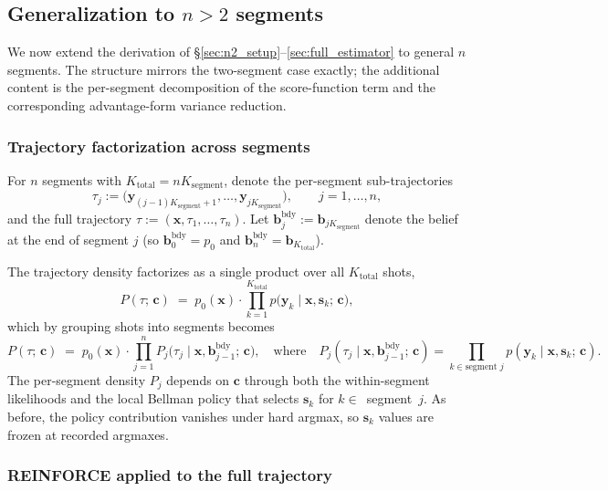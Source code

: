 \documentclass[11pt,a4paper]{article}
\newcommand{\bc}{\bm{c}}
\newcommand{\bx}{\bm{x}}
\newcommand{\by}{\bm{y}}
\newcommand{\bs}{\bm{s}}
\newcommand{\bb}{\bm{b}}
\begin{document}
\subsection{Generalization to \texorpdfstring{$n > 2$}{n > 2} segments}
\label{sec:nseg_general}

We now extend the derivation of \S\ref{sec:n2_setup}--\ref{sec:full_estimator} to general
$n$ segments.  The structure mirrors the two-segment case exactly; the additional content is
the per-segment decomposition of the score-function term and the corresponding advantage-form
variance reduction.

\subsubsection{Trajectory factorization across segments}
\label{sec:nseg_factorization}

For $n$ segments with $K_\mathrm{total} = n K_\mathrm{segment}$, denote the per-segment
sub-trajectories
\[
\tau_j := \bigl(\by_{(j-1)K_\mathrm{segment} + 1}, \ldots, \by_{j K_\mathrm{segment}}\bigr), \qquad j = 1, \ldots, n,
\]
and the full trajectory $\tau := (\bx, \tau_1, \ldots, \tau_n)$.  Let
$\bb^{\mathrm{bdy}}_j := \bb_{j K_\mathrm{segment}}$ denote the belief at the end of segment
$j$ (so $\bb^{\mathrm{bdy}}_0 = p_0$ and $\bb^{\mathrm{bdy}}_n = \bb_{K_\mathrm{total}}$).

The trajectory density factorizes as a single product over all $K_\mathrm{total}$ shots,
\begin{equation}
P(\tau;\, \bc)
\;=\;
p_0(\bx) \cdot \prod_{k=1}^{K_\mathrm{total}} p\bigl(\by_k \mid \bx, \bs_k;\, \bc\bigr),
\label{eq:Pfactor_full}
\end{equation}
which by grouping shots into segments becomes
\begin{equation}
P(\tau;\, \bc)
\;=\;
p_0(\bx) \cdot \prod_{j=1}^{n} P_j\bigl(\tau_j \mid \bx, \bb^{\mathrm{bdy}}_{j-1};\, \bc\bigr),
\quad \text{where} \quad
P_j(\tau_j \mid \bx, \bb^{\mathrm{bdy}}_{j-1};\, \bc) = \prod_{k \in \text{segment } j} p(\by_k \mid \bx, \bs_k;\, \bc).
\label{eq:Pfactor_perseg}
\end{equation}
The per-segment density $P_j$ depends on $\bc$ through both the within-segment likelihoods and
the local Bellman policy that selects $\bs_k$ for $k \in$~segment~$j$.  As before, the policy
contribution vanishes under hard argmax, so $\bs_k$ values are frozen at recorded argmaxes.

\subsubsection{REINFORCE applied to the full trajectory}
\label{sec:nseg_reinforce}
\end{document}
